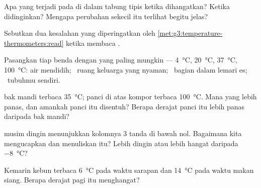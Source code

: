 \begin{exercise}[$\star$]\label{exo:g3:temperature-thermometers:3}
Apa yang terjadi pada  di dalam tabung tipis ketika 
dihangatkan? Ketika didinginkan? Mengapa perubahan sekecil itu
terlihat begitu jelas?
\end{exercise}

\begin{exercise}[$\star$]\label{exo:g3:temperature-thermometers:4}
Sebutkan dua kesalahan yang diperingatkan oleh
\cref{met:g3:temperature-thermometers:read} ketika membaca .
\end{exercise}

\begin{exercise}[$\star$]\label{exo:g3:temperature-thermometers:5}
Pasangkan tiap benda dengan  yang paling mungkin ---
\qty{4}{\celsius}, \qty{20}{\celsius}, \qty{37}{\celsius},
\qty{100}{\celsius}: air mendidih; \ ruang keluarga yang nyaman;
\ bagian dalam lemari es; \ tubuhmu sendiri.
\end{exercise}

\begin{exercise}[$\star$]\label{exo:g3:temperature-thermometers:6}
 bak mandi terbaca \qty{35}{\celsius}; panci di atas kompor
terbaca \qty{100}{\celsius}. Mana yang lebih panas, dan amankah panci
itu disentuh? Berapa derajat panci itu lebih panas daripada bak mandi?
\end{exercise}

\begin{exercise}[$\star$]\label{exo:g3:temperature-thermometers:7}
 musim dingin menunjukkan kolomnya $3$ tanda di bawah nol.
Bagaimana kita mengucapkan dan menuliskan  itu? Lebih dingin atau
lebih hangat daripada \qty{-8}{\celsius}?
\end{exercise}

\begin{exercise}[$\star$]\label{exo:g3:temperature-thermometers:8}
Kemarin  kebun terbaca \qty{6}{\celsius} pada waktu sarapan
dan \qty{14}{\celsius} pada waktu makan siang. Berapa derajat pagi itu
menghangat?
\end{exercise}

